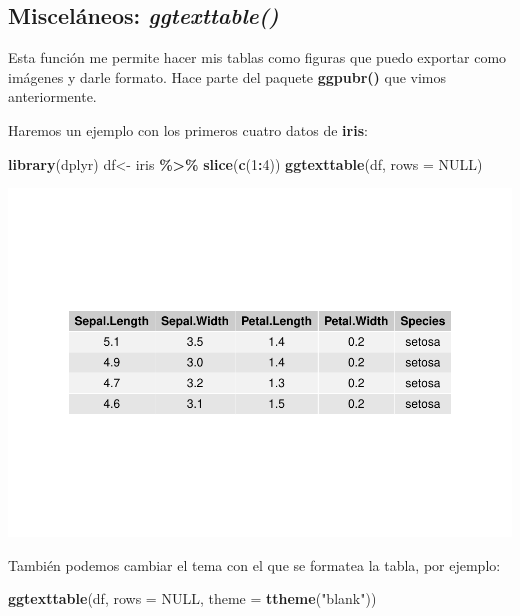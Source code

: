 \documentclass[
]{book}
\newenvironment{Shaded}{\begin{snugshade}}{\end{snugshade}}
\newcommand{\AttributeTok}[1]{\textcolor[rgb]{0.13,0.29,0.53}{#1}}
\newcommand{\ConstantTok}[1]{\textcolor[rgb]{0.56,0.35,0.01}{#1}}
\newcommand{\DecValTok}[1]{\textcolor[rgb]{0.00,0.00,0.81}{#1}}
\newcommand{\FunctionTok}[1]{\textcolor[rgb]{0.13,0.29,0.53}{\textbf{#1}}}
\newcommand{\NormalTok}[1]{#1}
\newcommand{\OtherTok}[1]{\textcolor[rgb]{0.56,0.35,0.01}{#1}}
\newcommand{\SpecialCharTok}[1]{\textcolor[rgb]{0.81,0.36,0.00}{\textbf{#1}}}
\newcommand{\StringTok}[1]{\textcolor[rgb]{0.31,0.60,0.02}{#1}}
\begin{document}
\subsection{\texorpdfstring{Misceláneos: \emph{ggtexttable()}}{Misceláneos: ggtexttable()}}\label{misceluxe1neos-ggtexttable}

Esta función me permite hacer mis tablas como figuras que puedo exportar como imágenes y darle formato.
Hace parte del paquete \textbf{ggpubr()} que vimos anteriormente.

Haremos un ejemplo con los primeros cuatro datos de \textbf{iris}:

\begin{Shaded}
\begin{Highlighting}[]
\FunctionTok{library}\NormalTok{(dplyr)}
\NormalTok{df}\OtherTok{\textless{}{-}}\NormalTok{ iris }\SpecialCharTok{\%\textgreater{}\%} \FunctionTok{slice}\NormalTok{(}\FunctionTok{c}\NormalTok{(}\DecValTok{1}\SpecialCharTok{:}\DecValTok{4}\NormalTok{))}
\FunctionTok{ggtexttable}\NormalTok{(df, }\AttributeTok{rows =} \ConstantTok{NULL}\NormalTok{)}
\end{Highlighting}
\end{Shaded}

\includegraphics{R_Manual_files/figure-latex/unnamed-chunk-231-1.pdf}

También podemos cambiar el tema con el que se formatea la tabla, por ejemplo:

\begin{Shaded}
\begin{Highlighting}[]
\FunctionTok{ggtexttable}\NormalTok{(df, }\AttributeTok{rows =} \ConstantTok{NULL}\NormalTok{, }\AttributeTok{theme =} \FunctionTok{ttheme}\NormalTok{(}\StringTok{"blank"}\NormalTok{))}
\end{Highlighting}
\end{Shaded}
\end{document}

